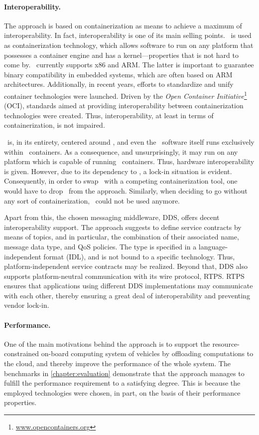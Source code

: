 \paragraph{Interoperability.}
The approach is based on containerization as means to achieve a maximum of interoperability. In fact, interoperability is one of its main selling points. \docker\ is used as containerization technology, which allows software to run on any platform that possesses a container engine and has a kernel---properties that is not hard to come by. \docker\ currently supports x86 and ARM. The latter is important to guarantee binary compatibility in embedded systems, which are often based on ARM architectures. Additionally, in recent years, efforts to standardize and unify container technologies were launched. Driven by the \emph{Open Container Initiative}\footnote{\url{www.opencontainers.org}} (OCI), standards aimed at providing interoperability between containerization technologies were created. Thus, interoperability, at least in terms of containerization, is not impaired.

\weave\ is, in its entirety, centered around \docker , and even the \weave\ software itself runs exclusively within \docker\ containers. As a consequence, and unsurprisingly, it may run on any platform which is capable of running \docker\ containers. Thus, hardware interoperability is given. However, due to its dependency to \docker , a lock-in situation is evident. Consequently, in order to swap \docker\ with a competing containerization tool, one would have to drop \wnet\ from the approach. Similarly, when deciding to go without any sort of containerization, \weave\ could not be used anymore.

Apart from this, the chosen messaging middleware, DDS, offers decent interoperability support. The approach suggests to define service contracts by means of topics, and in particular, the combination of their associated name, message data type, and QoS policies. The type is specified in a language-independent format (IDL), and is not bound to a specific technology. Thus, platform-independent service contracts may be realized. Beyond that, DDS also supports platform-neutral communication with its wire protocol, RTPS. RTPS ensures that applications using different DDS implementations may communicate with each other, thereby ensuring a great deal of interoperability and preventing vendor lock-in.

\paragraph{Performance.}
One of the main motivations behind the approach is to support the resource-constrained on-board computing system of vehicles by offloading computations to the cloud, and thereby improve the performance of the whole system. The benchmarks in \autoref{chapter:evaluation} demonstrate that the approach manages to fulfill the performance requirement to a satisfying degree. This is because the employed technologies were chosen, in part, on the basis of their performance properties.


